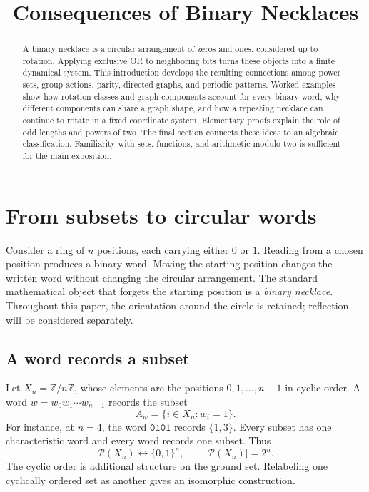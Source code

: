 \documentclass[11pt]{article}
\title{Consequences of Binary Necklaces}
\author{}
\date{}
\theoremstyle{definition}
\newcommand{\Z}{\mathbb Z}
\newcommand{\word}[1]{\mathtt{#1}}
\numberwithin{equation}{section}
\begin{document}
\maketitle
\vspace{-2.5em}
\begin{abstract}
A binary necklace is a circular arrangement of zeros and ones, considered
up to rotation. Applying exclusive OR to neighboring bits turns these
objects into a finite dynamical system. This introduction develops the
resulting connections among power sets, group actions, parity, directed
graphs, and periodic patterns. Worked examples show how rotation classes
and graph components account for every binary word, why different
components can share a graph shape, and how a repeating necklace can
continue to rotate in a fixed coordinate system. Elementary proofs explain
the role of odd lengths and powers of two. The final section connects
these ideas to an algebraic classification. Familiarity with sets,
functions, and arithmetic modulo two is sufficient for the main exposition.
\end{abstract}

\section{From subsets to circular words}\label{sec:words}

Consider a ring of $n$ positions, each carrying either $0$ or $1$. Reading
from a chosen position produces a binary word. Moving the starting
position changes the written word without changing the circular
arrangement. The standard mathematical object that forgets the starting
position is a \emph{binary necklace}.
Throughout this paper, the orientation around the circle is retained;
reflection will be considered separately.

\subsection{A word records a subset}

Let $X_n=\Z/n\Z$, whose elements are the positions $0,1,\ldots,n-1$ in
cyclic order. A word $w=w_0w_1\cdots w_{n-1}$ records the subset
\[
 A_w=\{i\in X_n:w_i=1\}.
\]
For instance, at $n=4$, the word $\word{0101}$ records $\{1,3\}$.
Every subset has one characteristic word and every word records one
subset. Thus
\[
 \mathcal P(X_n)\longleftrightarrow\{0,1\}^n,
 \qquad |\mathcal P(X_n)|=2^n.
\]
The cyclic order is additional structure on the ground set. Relabeling
one cyclically ordered set as another gives an isomorphic construction.
\end{document}
